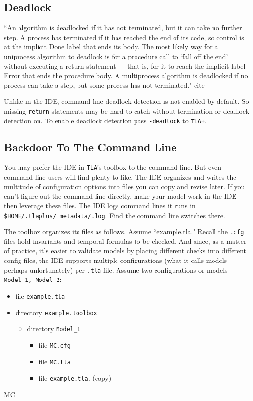 \documentclass[twocolumn]{article}
\begin{document}
\subsection{Deadlock}
``An algorithm is deadlocked if it has not terminated, but it can take no further step. A process has terminated if it has reached the end of its code, so control is at the implicit Done label that ends its body. The most likely way for a uniprocess algorithm to deadlock is for a procedure call to `fall off the end' without executing a return statement --- that is, for it to reach the implicit label Error that ends the procedure body. A multiprocess algorithm is deadlocked if no process can take a step, but some process has not terminated." cite

Unlike in the IDE, command line deadlock detection is not enabled by default. So missing \texttt{return} statements may be hard to catch without termination or deadlock detection on. To enable deadlock detection pass \texttt{-deadlock} to \texttt{TLA+}. 

\subsection{Backdoor To The Command Line}
You may prefer the IDE in \texttt{TLA}'s toolbox to the command line. But even command line users will find plenty to like. The IDE organizes and writes the multitude of configuration options into files you can copy and revise later. If you can't figure out the command line directly, make your model work in the IDE then leverage these files. The IDE logs command lines it runs in \texttt{\$HOME/.tlaplus/.metadata/.log}. Find the command line switches there.

The toolbox organizes its files as follows. Assume ``example.tla." Recall the \texttt{.cfg} files hold invariants and temporal formulas to be checked. And since, as a matter of practice, it's easier to validate models by placing different checks into different config files, the IDE supports multiple configurations (what it calls models perhaps unfortunately) per \texttt{.tla} file. Assume two configurations or models \texttt{Model\_1, Model\_2}:

\begin{itemize}
\item file \texttt{example.tla}
\item directory \texttt{example.toolbox}
	\begin{itemize}
		\item directory \texttt{Model\_1}
		\begin{itemize}
			\item file \texttt{MC.cfg}
			\item file \texttt{MC.tla}
			\item file \texttt{example.tla}, (copy) 
		\end{itemize}
	\end{itemize}
\end{itemize}
  
MC



\end{document}
